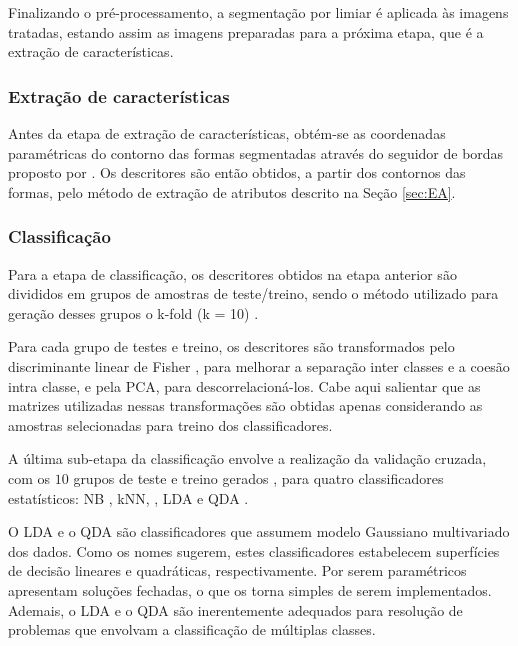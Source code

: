Finalizando o pré-processamento, a segmentação por limiar \cite{Gonzalez:2006} é aplicada às imagens tratadas, estando assim as imagens preparadas para a próxima etapa, que é a extração de características.

\subsubsection*{Extração de características}

Antes da etapa de extração de características, obtém-se as coordenadas paramétricas do contorno das formas segmentadas através do seguidor de bordas proposto por .
Os descritores são então obtidos, a partir dos contornos das formas, pelo método de extração de atributos descrito na Seção \ref{sec:EA}. 

\subsubsection*{Classificação}

Para a etapa de classificação, os descritores  obtidos na etapa anterior são divididos em grupos de amostras de teste/treino, sendo o método utilizado para geração desses grupos o k-fold (k = 10) \cite{Webb:2002}. 

Para cada grupo de testes e treino, os descritores são  transformados pelo discriminante linear de Fisher \cite{Webb:2002}, para melhorar a separação inter classes e a coesão intra classe, e pela \ac{PCA}, para  descorrelacioná-los. Cabe aqui salientar que as matrizes utilizadas nessas transformações são obtidas apenas considerando as amostras selecionadas para treino dos classificadores.

A última sub-etapa da classificação envolve a realização da validação cruzada, com os $10$ grupos de teste e treino gerados \cite{Webb:2002}, para quatro classificadores estatísticos: \ac{NB} \cite{Fukunaga:1990}, \ac{kNN}, \cite{Fukunaga:1990,Webb:2002}, \ac{LDA} \cite{Webb:2002} e \ac{QDA} \cite{Fukunaga:1990}. 

O \ac{LDA} e o \ac{QDA} são classificadores que assumem modelo Gaussiano multivariado dos dados. Como os nomes sugerem,  estes classificadores estabelecem superfícies de decisão lineares e quadráticas, respectivamente. Por serem paramétricos apresentam soluções fechadas, o que os torna simples de serem implementados. Ademais, o \ac{LDA} e o \ac{QDA} são inerentemente adequados para resolução de problemas que envolvam a classificação de múltiplas classes.

